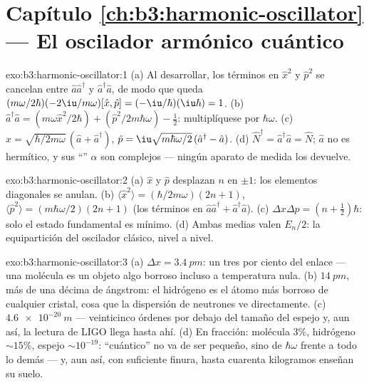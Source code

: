 \section*{Capítulo \ref{ch:b3:harmonic-oscillator} --- El oscilador armónico cuántico}

\begin{solution}{exo:b3:harmonic-oscillator:1}
(a) Al desarrollar, los términos en $\hat x^2$ y $\hat p^2$ se cancelan entre
$\hat a\hat a^\dagger$ y $\hat a^\dagger\hat a$, de modo que queda
$(m\omega/2\hbar)(-2\iu/m\omega)[\hat x, \hat p] =
(-\iu/\hbar)(\iu\hbar) = 1$. (b) $\hat a^\dagger\hat a = (m\omega\hat x^2/2\hbar) +
(\hat p^2/2m\hbar\omega) - \tfrac12$: multiplíquese por $\hbar\omega$. (c)
$\hat x = \sqrt{\hbar/2m\omega}\,(\hat a + \hat a^\dagger)$, $\hat p
= \iu\sqrt{m\hbar\omega/2}\,(\hat a^\dagger - \hat a)$. (d) $\hat
N^\dagger = \hat a^\dagger\hat a = \hat N$; $\hat a$ no es
hermítico, y sus ``'' $\alpha$ son complejos --- ningún
aparato de medida los devuelve.
\end{solution}

\begin{solution}{exo:b3:harmonic-oscillator:2}
(a) $\hat x$ y $\hat p$ desplazan $n$ en $\pm1$: los elementos diagonales se
anulan. (b) $\langle\hat x^2\rangle = (\hbar/2m\omega)(2n + 1)$,
$\langle\hat p^2\rangle = (m\hbar\omega/2)(2n + 1)$ (los términos en $\hat
a\hat a^\dagger + \hat a^\dagger\hat a$). (c) $\Delta x\Delta p
= (n + \tfrac12)\hbar$: solo el estado fundamental es mínimo. (d) Ambas
medias valen $E_n/2$: la equipartición del oscilador clásico, nivel a
nivel.
\end{solution}

\begin{solution}{exo:b3:harmonic-oscillator:3}
(a) $\Delta x = \qty{3.4}{pm}$: un tres por ciento del enlace --- una
molécula es un objeto algo borroso incluso a temperatura nula. (b)
$\qty{14}{pm}$, más de una décima de ángstrom: el hidrógeno es el átomo más
borroso de cualquier cristal, cosa que la dispersión de neutrones ve
directamente. (c) $\qty{4.6e-20}{m}$ --- veinticinco órdenes por debajo del
tamaño del espejo y, aun así, la lectura de LIGO llega hasta ahí. (d) En
fracción: molécula $3\%$, hidrógeno $\sim15\%$, espejo $\sim10^{-19}$:
``cuántico'' no va de ser pequeño, sino de $\hbar\omega$
frente a todo lo demás --- y, aun así, con suficiente finura, hasta cuarenta
kilogramos enseñan su suelo.
\end{solution}


